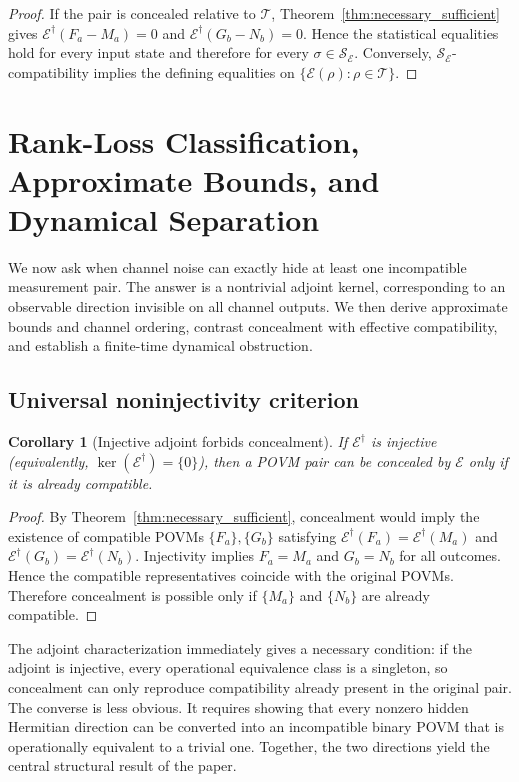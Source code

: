 \documentclass[
aps,pra,twocolumn,10pt,
superscriptaddress,longbibliography,floatfix
]{revtex4-2}
\newtheorem{corollary}[theorem]{Corollary}
\begin{document}
\begin{proof}
If the pair is concealed relative to $\mathcal T$, Theorem~\ref{thm:necessary_sufficient} gives $\mathcal E^\dagger(F_a-M_a)=0$ and $\mathcal E^\dagger(G_b-N_b)=0$. Hence the statistical equalities hold for every input state and therefore for every $\sigma\in\mathcal S_{\mathcal E}$. Conversely, $\mathcal S_{\mathcal E}$-compatibility implies the defining equalities on $\{\mathcal E(\rho):\rho\in\mathcal T\}$.
\end{proof}

\section{Rank-Loss Classification, Approximate Bounds, and Dynamical Separation}
\label{sec:classification}

We now ask when channel noise can exactly hide at least one incompatible measurement pair. The answer is a nontrivial adjoint kernel, corresponding to an observable direction invisible on all channel outputs. We then derive approximate bounds and channel ordering, contrast concealment with effective compatibility, and establish a finite-time dynamical obstruction.

\subsection{Universal noninjectivity criterion}

\begin{corollary}[Injective adjoint forbids concealment]
\label{cor:invertible}
If $\mathcal{E}^\dagger$ is injective (equivalently, $\ker(\mathcal{E}^\dagger)=\{0\}$), then a POVM pair can be concealed by $\mathcal E$ only if it is already compatible.
\end{corollary}
\begin{proof}
By Theorem~\ref{thm:necessary_sufficient}, concealment would imply the existence of compatible POVMs $\{F_a\},\{G_b\}$ satisfying $\mathcal{E}^\dagger(F_a) = \mathcal{E}^\dagger(M_a)$ and $\mathcal{E}^\dagger(G_b) = \mathcal{E}^\dagger(N_b)$. Injectivity implies $F_a = M_a$ and $G_b = N_b$ for all outcomes. Hence the compatible representatives coincide with the original POVMs. Therefore concealment is possible only if $\{M_a\}$ and $\{N_b\}$ are already compatible.
\end{proof}

The adjoint characterization immediately gives a necessary condition: if the adjoint is injective, every operational equivalence class is a singleton, so concealment can only reproduce compatibility already present in the original pair. The converse is less obvious. It requires showing that every nonzero hidden Hermitian direction can be converted into an incompatible binary POVM that is operationally equivalent to a trivial one. Together, the two directions yield the central structural result of the paper.
\end{document}
